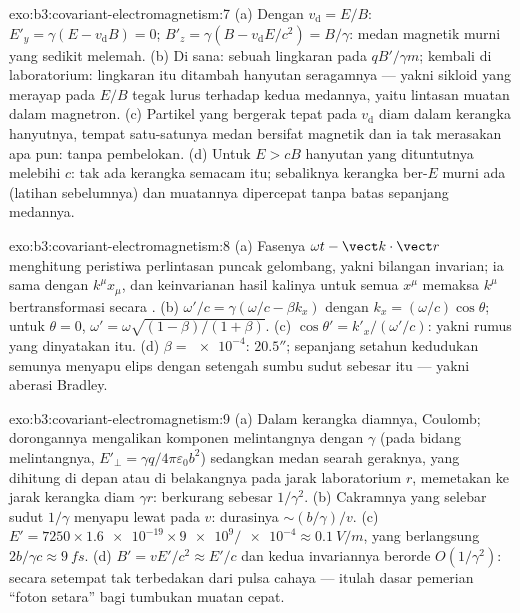 \begin{solution}{exo:b3:covariant-electromagnetism:7}
(a) Dengan $v_{\text{d}} = E/B$: $E'_y = \gamma(E - v_{\text{d}}B) =
0$; $B'_z = \gamma(B - v_{\text{d}}E/c^2) = B/\gamma$: medan magnetik
murni yang sedikit melemah. (b) Di sana: sebuah lingkaran pada
$qB'/\gamma m$; kembali di laboratorium: lingkaran itu ditambah hanyutan
seragamnya --- yakni sikloid yang merayap pada $E/B$ tegak lurus terhadap
kedua medannya, yaitu lintasan muatan dalam magnetron. (c) Partikel yang
bergerak tepat pada $v_{\text{d}}$ diam dalam kerangka hanyutnya, tempat
satu-satunya medan bersifat magnetik dan ia tak merasakan apa pun:
tanpa pembelokan. (d) Untuk $E > cB$ hanyutan yang dituntutnya melebihi
$c$: tak ada kerangka semacam itu; sebaliknya kerangka ber-$E$ murni ada
(latihan sebelumnya) dan muatannya dipercepat tanpa batas sepanjang
medannya.
\end{solution}

\begin{solution}{exo:b3:covariant-electromagnetism:8}
(a) Fasenya $\omega t - \vect k\cdot\vect r$ menghitung peristiwa
perlintasan puncak gelombang, yakni bilangan invarian; ia sama dengan
$k^\mu x_\mu$, dan keinvarianan hasil kalinya untuk semua $x^\mu$
memaksa $k^\mu$ bertransformasi secara . (b) $\omega'/c = \gamma(\omega/c -
\beta k_x)$ dengan $k_x = (\omega/c)\cos\theta$; untuk $\theta = 0$,
$\omega' = \omega\sqrt{(1-\beta)/(1+\beta)}$. (c) $\cos\theta' =
k'_x/(\omega'/c)$: yakni rumus yang dinyatakan itu. (d) $\beta = \num{e-4}$:
$20.5''$; sepanjang setahun kedudukan semunya menyapu elips dengan
setengah sumbu sudut sebesar itu --- yakni aberasi Bradley.
\end{solution}

\begin{solution}{exo:b3:covariant-electromagnetism:9}
(a) Dalam kerangka diamnya, Coulomb; dorongannya mengalikan komponen
melintangnya dengan $\gamma$ (pada bidang melintangnya, $E'_\perp = \gamma
q/4\pi\varepsilon_0b^2$) sedangkan medan searah geraknya, yang dihitung
di depan atau di belakangnya pada jarak laboratorium $r$, memetakan ke
jarak kerangka diam $\gamma r$: berkurang sebesar $1/\gamma^2$. (b)
Cakramnya yang selebar sudut $1/\gamma$ menyapu lewat pada $v$: durasinya
$\sim (b/\gamma)/v$. (c)
$E' = 7250 \times \num{1.6e-19} \times \num{9e9}/\num{e-4} \approx
\qty{0.1}{V/m}$, yang berlangsung $2b/\gamma c \approx \qty{9}{fs}$. (d)
$B' = vE'/c^2 \approx E'/c$ dan kedua invariannya berorde $O(1/\gamma^2)$:
secara setempat tak terbedakan dari pulsa cahaya --- itulah dasar
pemerian ``foton setara'' bagi tumbukan muatan cepat.
\end{solution}

